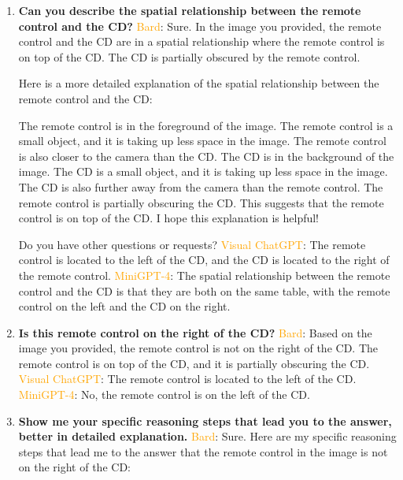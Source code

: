 \begin{enumerate}
    \item \textbf{Can you describe the spatial relationship between the remote control and the CD?}
    \subitem \textcolor{orange}{Bard}: 
    Sure. In the image you provided, the remote control and the CD are in a spatial relationship where the remote control is on top of the CD. The CD is partially obscured by the remote control.
    
    Here is a more detailed explanation of the spatial relationship between the remote control and the CD:
    
    The remote control is in the foreground of the image. The remote control is a small object, and it is taking up less space in the image. The remote control is also closer to the camera than the CD.
    The CD is in the background of the image. The CD is a small object, and it is taking up less space in the image. The CD is also further away from the camera than the remote control.
    The remote control is partially obscuring the CD. This suggests that the remote control is on top of the CD.
    I hope this explanation is helpful!
    
    Do you have other questions or requests?
    \subitem \textcolor{orange}{Visual ChatGPT}: The remote control is located to the left of the CD, and the CD is located to the right of the remote control.
    \subitem \textcolor{orange}{MiniGPT-4}: The spatial relationship between the remote control and the CD is that they are both on the same table, with the remote control on the left and the CD on the right.
    \item \textbf{Is this remote control on the right of the CD?}
    \subitem \textcolor{orange}{Bard}: Based on the image you provided, the remote control is not on the right of the CD. The remote control is on top of the CD, and it is partially obscuring the CD.
    \subitem \textcolor{orange}{Visual ChatGPT}: The remote control is located to the left of the CD.
    \subitem \textcolor{orange}{MiniGPT-4}: No, the remote control is on the left of the CD.
    \item \textbf{Show me your specific reasoning steps that lead you to the answer, better in detailed explanation.}
    \subitem \textcolor{orange}{Bard}: 
    Sure. Here are my specific reasoning steps that lead me to the answer that the remote control in the image is not on the right of the CD:
    

\end{enumerate}
